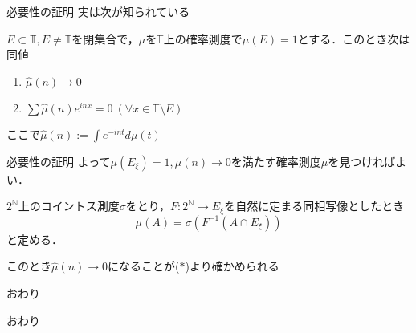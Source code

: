 \documentclass[dvipdfmx,17pt]{beamer}
\theoremstyle{plain}
\newcommand{\N}{\mathbb{N}}
\begin{document}
\begin{frame}{必要性の証明}
実は次が知られている

\vspace{0.5cm}
$E \subset \mathbb{T}, E \ne \mathbb{T}$を閉集合で，$\mu$を$\mathbb{T}$上の確率測度で$\mu(E) = 1$とする．このとき次は同値
\begin{enumerate}
\item $\hat{\mu}(n) \to 0$
\item $\sum \hat{\mu}(n) e^{inx} = 0\ (\forall x \in \mathbb{T} \setminus E)$
\end{enumerate}
ここで$\hat{\mu}(n) := \int e^{-int} d\mu(t)$
\end{frame}

\begin{frame}{必要性の証明}
よって$\mu(E_\xi) = 1, \hat{\mu}(n) \to 0$を満たす確率測度$\mu$を見つければよい．
	
$2^{\N}$上のコイントス測度$\sigma$をとり，$F: 2^{\N} \to E_\xi$を自然に定まる同相写像としたとき
\[\mu(A) = \sigma(F^{-1}(A \cap E_\xi))\]
と定める．

このとき$\hat{\mu}(n) \to 0$になることが($\ast$)より確かめられる
\end{frame}

\begin{frame}{おわり}
\begin{center}おわり\end{center}
\end{frame}
\end{document}
